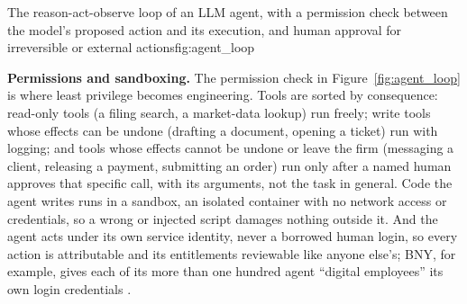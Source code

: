 \documentclass[../ai_in_finance]{subfiles}
\begin{document}
\begin{bookfigure}{The reason-act-observe loop of an LLM agent, with a permission check between the model's proposed action and its execution, and human approval for irreversible or external actions}{fig:agent_loop}
\end{bookfigure}

\textbf{Permissions and sandboxing.} The permission check in Figure~\ref{fig:agent_loop} is where least privilege becomes engineering. Tools are sorted by consequence: read-only tools (a filing search, a market-data lookup) run freely; write tools whose effects can be undone (drafting a document, opening a ticket) run with logging; and tools whose effects cannot be undone or leave the firm (messaging a client, releasing a payment, submitting an order) run only after a named human approves that specific call, with its arguments, not the task in general. Code the agent writes runs in a sandbox, an isolated container with no network access or credentials, so a wrong or injected script damages nothing outside it. And the agent acts under its own service identity, never a borrowed human login, so every action is attributable and its entitlements reviewable like anyone else's; BNY, for example, gives each of its more than one hundred agent ``digital employees'' its own login credentials \parencite{axios2025bny}.
\end{document}
